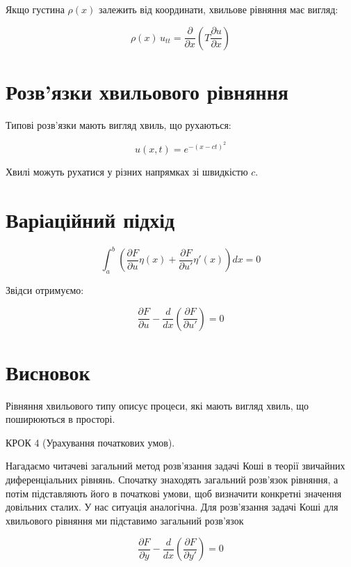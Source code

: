 Якщо густина \(\rho(x)\) залежить від координати, хвильове рівняння має вигляд:

\[
\rho(x)\,u_{tt} = \frac{\partial}{\partial x}\left( T \frac{\partial u}{\partial x} \right)
\]

\section{Розв'язки хвильового рівняння}\label{ux440ux43eux437ux432ux44fux437ux43aux438-ux445ux432ux438ux43bux44cux43eux432ux43eux433ux43e-ux440ux456ux432ux43dux44fux43dux43dux44f}

Типові розв'язки мають вигляд хвиль, що рухаються:

\[
u(x,t) = e^{-(x - ct)^2}
\]

Хвилі можуть рухатися у різних напрямках зі швидкістю \(c\).

\section{Варіаційний підхід}\label{ux432ux430ux440ux456ux430ux446ux456ux439ux43dux438ux439-ux43fux456ux434ux445ux456ux434}

\[
\int_a^b \left( \frac{\partial F}{\partial u} \eta(x) + \frac{\partial F}{\partial u'} \eta'(x) \right) dx = 0
\]

Звідси отримуємо:

\[
\frac{\partial F}{\partial u} - \frac{d}{dx}\left( \frac{\partial F}{\partial u'} \right) = 0
\]

\section{Висновок}\label{ux432ux438ux441ux43dux43eux432ux43eux43a-1}

Рівняння хвильового типу описує процеси, які мають вигляд хвиль, що поширюються в просторі.

КРОК 4 (Урахування початкових умов).

Нагадаємо читачеві загальний метод розв'язання задачі Коші в теорії звичайних диференціальних рівнянь. Спочатку знаходять загальний розв'язок рівняння, а потім підставляють його в початкові умови, щоб визначити конкретні значення довільних сталих. У нас ситуація аналогічна. Для розв'язання задачі Коші для хвильового рівняння ми підставимо загальний розв'язок

\[
\frac{\partial F}{\partial y} - \frac{d}{dx}\!\left(\frac{\partial F}{\partial y'}\right) = 0
\]

